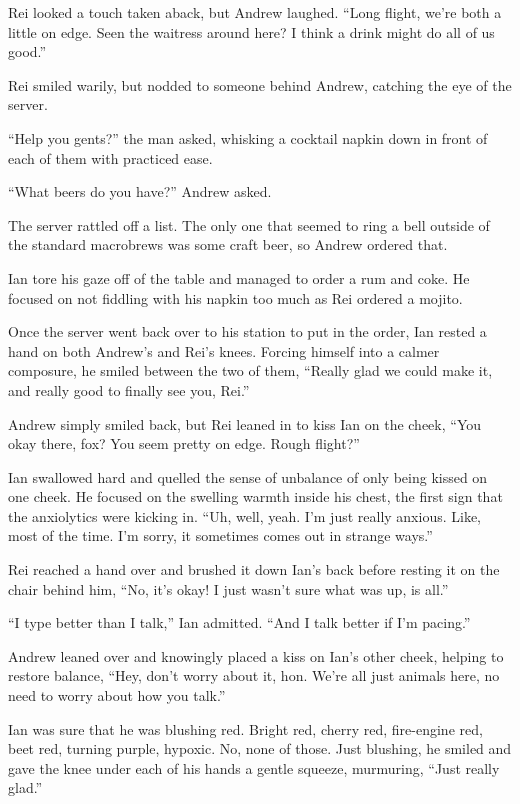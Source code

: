 \documentclass[12pt,letterpaper,oneside]{memoir}
\begin{document}
  Rei looked a touch taken aback, but Andrew laughed. ``Long flight, we're both a little on edge. Seen the waitress around here? I think a drink might do all of us good.''

  Rei smiled warily, but nodded to someone behind Andrew, catching the eye of the server.

  ``Help you gents?'' the man asked, whisking a cocktail napkin down in front of each of them with practiced ease.

  ``What beers do you have?'' Andrew asked.

  The server rattled off a list. The only one that seemed to ring a bell outside of the standard macrobrews was some craft beer, so Andrew ordered that.

  Ian tore his gaze off of the table and managed to order a rum and coke. He focused on not fiddling with his napkin too much as Rei ordered a mojito.

  Once the server went back over to his station to put in the order, Ian rested a hand on both Andrew's and Rei's knees. Forcing himself into a calmer composure, he smiled between the two of them, ``Really glad we could make it, and really good to finally see you, Rei.''

  Andrew simply smiled back, but Rei leaned in to kiss Ian on the cheek, ``You okay there, fox? You seem pretty on edge. Rough flight?''

  Ian swallowed hard and quelled the sense of unbalance of only being kissed on one cheek. He focused on the swelling warmth inside his chest, the first sign that the anxiolytics were kicking in. ``Uh, well, yeah. I'm just really anxious. Like, most of the time. I'm sorry, it sometimes comes out in strange ways.''

  Rei reached a hand over and brushed it down Ian's back before resting it on the chair behind him, ``No, it's okay! I just wasn't sure what was up, is all.''

  ``I type better than I talk,'' Ian admitted. ``And I talk better if I'm pacing.''

  Andrew leaned over and knowingly placed a kiss on Ian's other cheek, helping to restore balance, ``Hey, don't worry about it, hon. We're all just animals here, no need to worry about how you talk.''

  Ian was sure that he was blushing red. Bright red, cherry red, fire-engine red, beet red, turning purple, hypoxic. No, none of those. Just blushing, he smiled and gave the knee under each of his hands a gentle squeeze, murmuring, ``Just really glad.''
\end{document}
